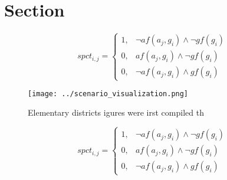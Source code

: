 \documentclass[a4paper]{article}
\begin{document}
\section{Section}

\begin{equation}
spct_{i,j} =
\begin{cases}
1, & \text{$\neg af(a_j,g_i) \wedge \neg gf(g_i)$}\\
0, & \text{$af(a_j,g_i) \wedge \neg gf(g_i)$}\\
0, & \text{$\neg af(a_j,g_i) \wedge gf(g_i)$}
\end{cases}
\end{equation}

\begin{figure}
\centering
\texttt{[image: ../scenario\_visualization.png]}
\caption{Elementary districts igures were irst compiled th
}
\end{figure}
 
\begin{equation}
spct_{i,j} =
\begin{cases}
1, & \text{$\neg af(a_j,g_i) \wedge \neg gf(g_i)$}\\
0, & \text{$af(a_j,g_i) \wedge \neg gf(g_i)$}\\
0, & \text{$\neg af(a_j,g_i) \wedge gf(g_i)$}
\end{cases}
\end{equation}
\end{document}
